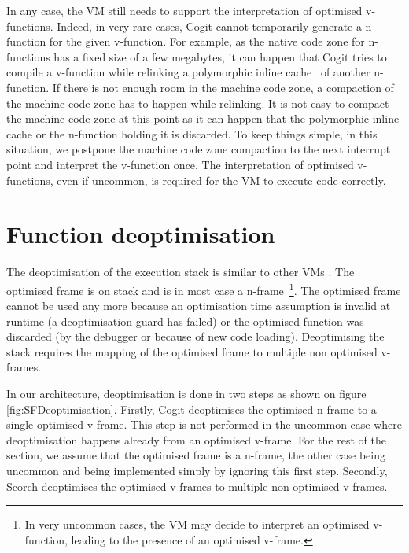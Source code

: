 \documentclass[a4paper,12pt,twoside]{../includes/ThesisStyle}
\begin{document}
In any case, the VM still needs to support the interpretation of optimised v-functions. Indeed, in very rare cases, Cogit cannot temporarily generate a n-function for the given v-function. For example, as the native code zone for n-functions has a fixed size of a few megabytes, it can happen that Cogit tries to compile a v-function while relinking a polymorphic inline cache~\cite{Holz91a} of another n-function. If there is not enough room in the machine code zone, a compaction of the machine code zone has to happen while relinking. It is not easy to compact the machine code zone at this point as it can happen that the polymorphic inline cache or the n-function holding it is discarded. To keep things simple, in this situation, we postpone the machine code zone compaction to the next interrupt point and interpret the v-function once. The interpretation of optimised v-functions, even if uncommon, is required for the VM to execute code correctly.  


\section {Function deoptimisation}

The deoptimisation of the execution stack is similar to other VMs \cite{Fin03a, Holz92a}. The optimised frame is on stack and is in most case a n-frame~\footnote{In very uncommon cases, the VM may decide to interpret an optimised v-function, leading to the presence of an optimised v-frame.}. The optimised frame cannot be used any more because an optimisation time assumption is invalid at runtime (a deoptimisation guard has failed) or the optimised function was discarded (by the debugger or because of new code loading). Deoptimising the stack requires the mapping of the optimised frame to multiple non optimised v-frames. 

In our architecture, deoptimisation is done in two steps as shown on figure \ref{fig:SFDeoptimisation}. Firstly, Cogit deoptimises the optimised n-frame to a single optimised v-frame. This step is not performed in the uncommon case where deoptimisation happens already from an optimised v-frame. For the rest of the section, we assume that the optimised frame is a n-frame, the other case being uncommon and being implemented simply by ignoring this first step. Secondly, Scorch deoptimises the optimised v-frames to multiple non optimised v-frames.
\end{document}
